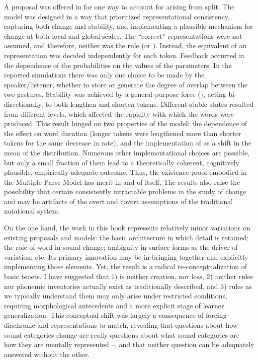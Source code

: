A proposal was offered in  for one
way to account for  arising from  split.
The model was designed in a way that prioritized representational
consistency, capturing both change and stability, and implementing
a plausible mechanism for change at both local and global scales.
The “correct”  representations were not assumed,
and therefore, neither was the  rule (or  ).
Instead, the equivalent of an  representation was decided
independently for each token. Feedback occurred in the dependence
of the  probabilities on the values of the  parameters.
In the reported simulations there was only one choice to be made by
the speaker/listener, whether to store or generate the degree of overlap
between the two  gestures. Stability was achieved by a
general-purpose force (), acting bi-directionally, to
both lengthen and shorten tokens. Different stable states resulted
from different  levels, which affected the rapidity
with which the words were produced. This result hinged on two properties
of the model: the dependence of the  effect on word duration
(longer tokens were lengthened more than shorter tokens for the same
decrease in rate), and the implementation of  as
a shift in the mean of the  distribution. Numerous other
implementational choices are possible, but only a small fraction of
them lead to a theoretically coherent, cognitively plausible, empirically
adequate outcome. Thus, the existence proof embodied in the Multiple-Parse
Model has merit in and of itself. The results also raise the possibility
that certain consistently intractable problems in the study of change
and  may be artifacts of the overt and covert assumptions
of the traditional notational system.

On the one hand, the work in this book represents relatively minor
variations on existing proposals and models: the basic  architecture
in which  detail is retained; the role of word 
in sound change; ambiguity in surface forms as the driver of variation;
etc. Its primary innovation may be in bringing together and explicitly
implementing those elements. Yet, the result is a radical re-conceptualization
of basic  tenets. I have suggested that 1)  is neither 
creation, nor  loss, 2) neither  rules
nor phonemic inventories actually exist as traditionally described, and 3) 
rules as we typically understand them may only arise under restricted
conditions, requiring morphological antecedents and a more explicit
stage of learner generalization. This conceptual shift was largely
a consequence of forcing diachronic and  representations
to match, revealing that questions about how sound categories change
are really questions about what sound categories are – how they are
mentally represented –, and that neither question can be adequately
answered without the other.
